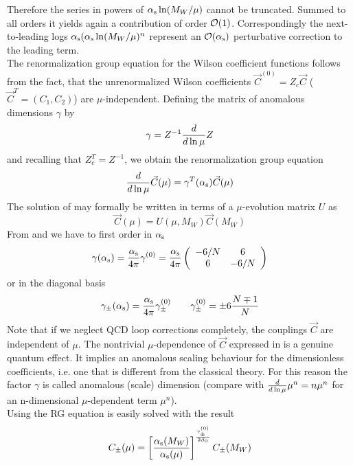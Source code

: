 Therefore the series in powers of $\alpha_{\rm s}\ln(M_W/\mu)$ cannot be
truncated. Summed to all orders it yields again a contribution of
order ${\cal O}(1)$. Correspondingly the next-to-leading logs
$\alpha_{\rm s}(\alpha_{\rm s}\ln(M_W/\mu)^n$ represent an ${\cal O}(\alpha_{\rm s})$
perturbative correction to the leading term.\\
The renormalization group equation for the Wilson coefficient functions
follows from the fact, that the unrenormalized Wilson coefficients
$\vec C^{(0)}=Z_c \vec C$ ($\vec C^T=(C_1, C_2)$)
are $\mu$-independent. Defining the matrix
of anomalous dimensions $\gamma$ by
\begin{equation}\label{gazz} \gamma=Z^{-1}{d\over d\ln\mu}Z  \end{equation}
and recalling that $Z^T_c=Z^{-1}$, we obtain the renormalization group
equation
\begin{equation}\label{rgc}
{d\over d\ln\mu}\vec C(\mu)=\gamma^T(\alpha_{\rm s}) \vec C(\mu)  \end{equation}
The solution of  may formally be written in terms of a
$\mu$-evolution matrix $U$ as
\begin{equation}\label{rgcu}
\vec C(\mu)=U(\mu, M_W) \vec C(M_W)  \end{equation}
From  and  we have to first order in $\alpha_{\rm s}$
\begin{equation}\label{g120} \gamma(\alpha_{\rm s})=\frac{\alpha_{\rm s}}{4 \pi} \gamma^{(0)}=\frac{\alpha_{\rm s}}{4 \pi}
 \left(\begin{array}{cc} -6/N & 6 \\
                          6 & -6/N
    \end{array}\right)   \end{equation}
or in the diagonal basis
\begin{equation}\label{gpm0}
\gamma_\pm(\alpha_{\rm s})=\frac{\alpha_{\rm s}}{4 \pi}\gamma^{(0)}_\pm \qquad  \gamma^{(0)}_\pm=
   \pm 6{N\mp1\over N}  \end{equation}
Note that if we neglect QCD loop corrections completely, the
couplings $\vec C$ are independent of $\mu$. The nontrivial
$\mu$-dependence of $\vec C$ expressed in  is a genuine
quantum effect. It implies an anomalous scaling behaviour for the
dimensionless coefficients, i.e. one that is different from the
classical theory. For this reason the factor $\gamma$ is called
anomalous (scale) dimension (compare  with
${d\over d\ln\mu}\mu^n=n \mu^n$ for an n-dimensional $\mu$-dependent
term $\mu^n$).\\
Using  the RG equation  is easily solved with the
result
\begin{equation}\label{cpmrg}
C_\pm(\mu)=\left[{\alpha_{\rm s}(M_W)\over\alpha_{\rm s}(\mu)}\right]^{\gamma^{(0)}_\pm\over
  2\beta_0} C_\pm(M_W)  \end{equation}
